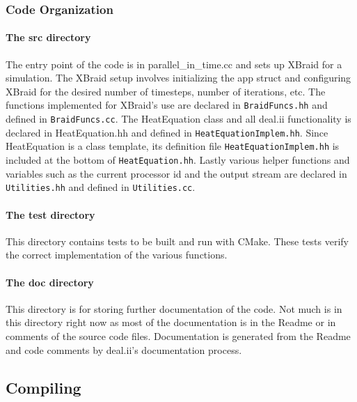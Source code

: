 \documentclass{article}
\begin{document}
\subsubsection{Code Organization}\label{code-organization}

\paragraph{The src directory}\label{the-src-directory}

The entry point of the code is in parallel\_in\_time.cc and sets up
XBraid for a simulation. The XBraid setup involves initializing the app
struct and configuring XBraid for the desired number of timesteps,
number of iterations, etc. The functions implemented for XBraid's use
are declared in \texttt{BraidFuncs.hh} and defined in \texttt{BraidFuncs.cc}. The
HeatEquation class and all deal.ii functionality is declared in
HeatEquation.hh and defined in \texttt{HeatEquationImplem.hh}. Since HeatEquation
is a class template, its definition file \texttt{HeatEquationImplem.hh} is
included at the bottom of \texttt{HeatEquation.hh}. Lastly various helper
functions and variables such as the current processor id and the output
stream are declared in \texttt{Utilities.hh} and defined in \texttt{Utilities.cc}.

\paragraph{The test directory}\label{the-test-directory}

This directory contains tests to be built and run with CMake. These
tests verify the correct implementation of the various functions.

\paragraph{The doc directory}\label{the-doc-directory}

This directory is for storing further documentation of the code. Not
much is in this directory right now as most of the documentation is in
the Readme or in comments of the source code files.
Documentation is generated from the Readme and code comments by deal.ii's documentation process.

\subsection{Compiling}\label{compiling}
\end{document}
